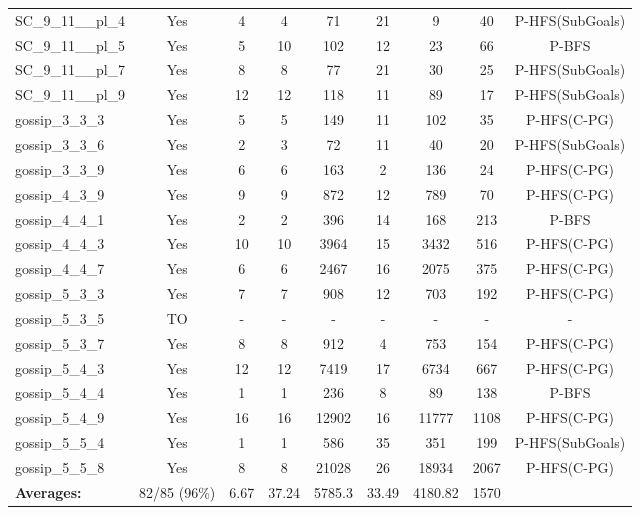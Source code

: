 \documentclass{article}
\begin{document}
\begin{tabular}{lcccccccc}
SC\_9\_11\_\_pl\_4 & Yes & 4 & 4 & 71 & 21 & 9 & 40 & P-HFS(SubGoals) \\
SC\_9\_11\_\_pl\_5 & Yes & 5 & 10 & 102 & 12 & 23 & 66 & P-BFS \\
SC\_9\_11\_\_pl\_7 & Yes & 8 & 8 & 77 & 21 & 30 & 25 & P-HFS(SubGoals) \\
SC\_9\_11\_\_pl\_9 & Yes & 12 & 12 & 118 & 11 & 89 & 17 & P-HFS(SubGoals) \\
gossip\_3\_3\_3 & Yes & 5 & 5 & 149 & 11 & 102 & 35 & P-HFS(C-PG) \\
gossip\_3\_3\_6 & Yes & 2 & 3 & 72 & 11 & 40 & 20 & P-HFS(SubGoals) \\
gossip\_3\_3\_9 & Yes & 6 & 6 & 163 & 2 & 136 & 24 & P-HFS(C-PG) \\
gossip\_4\_3\_9 & Yes & 9 & 9 & 872 & 12 & 789 & 70 & P-HFS(C-PG) \\
gossip\_4\_4\_1 & Yes & 2 & 2 & 396 & 14 & 168 & 213 & P-BFS \\
gossip\_4\_4\_3 & Yes & 10 & 10 & 3964 & 15 & 3432 & 516 & P-HFS(C-PG) \\
gossip\_4\_4\_7 & Yes & 6 & 6 & 2467 & 16 & 2075 & 375 & P-HFS(C-PG) \\
gossip\_5\_3\_3 & Yes & 7 & 7 & 908 & 12 & 703 & 192 & P-HFS(C-PG) \\
gossip\_5\_3\_5 & TO & - & - & - & - & - & - & - \\
gossip\_5\_3\_7 & Yes & 8 & 8 & 912 & 4 & 753 & 154 & P-HFS(C-PG) \\
gossip\_5\_4\_3 & Yes & 12 & 12 & 7419 & 17 & 6734 & 667 & P-HFS(C-PG) \\
gossip\_5\_4\_4 & Yes & 1 & 1 & 236 & 8 & 89 & 138 & P-BFS \\
gossip\_5\_4\_9 & Yes & 16 & 16 & 12902 & 16 & 11777 & 1108 & P-HFS(C-PG) \\
gossip\_5\_5\_4 & Yes & 1 & 1 & 586 & 35 & 351 & 199 & P-HFS(SubGoals) \\
gossip\_5\_5\_8 & Yes & 8 & 8 & 21028 & 26 & 18934 & 2067 & P-HFS(C-PG) \\
\textbf{Averages:} & 82/85 (96\%) & 6.67 & 37.24 & 5785.3 & 33.49 & 4180.82 & 1570 & \\
\bottomrule
\end{tabular}
\\[0.7cm]
\end{document}
